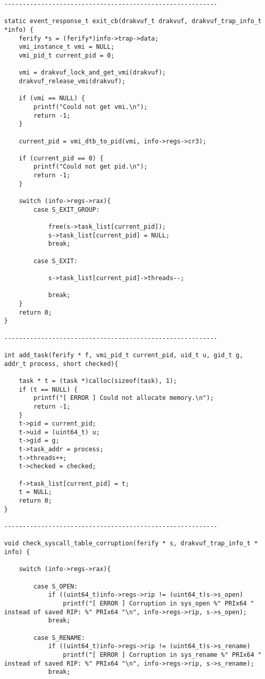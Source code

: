 {\begin{lstlisting}[style=CStyle]
----------------------------------------------------------

static event_response_t exit_cb(drakvuf_t drakvuf, drakvuf_trap_info_t *info) {
	ferify *s = (ferify*)info->trap->data;
	vmi_instance_t vmi = NULL; 
	vmi_pid_t current_pid = 0;
	
	vmi = drakvuf_lock_and_get_vmi(drakvuf); 
	drakvuf_release_vmi(drakvuf);
	
	if (vmi == NULL) {
		printf("Could not get vmi.\n");
		return -1;
	}
	
	current_pid = vmi_dtb_to_pid(vmi, info->regs->cr3);
	
	if (current_pid == 0) {
		printf("Could not get pid.\n");
		return -1;
	}

	switch (info->regs->rax){
		case S_EXIT_GROUP:	

			free(s->task_list[current_pid]);
			s->task_list[current_pid] = NULL;
			break;
		
		case S_EXIT:
	
			s->task_list[current_pid]->threads--;
		
			break;
	}
	return 0;
}

----------------------------------------------------------

int add_task(ferify * f, vmi_pid_t current_pid, uid_t u, gid_t g, addr_t process, short checked){

	task * t = (task *)calloc(sizeof(task), 1);
	if (t == NULL) {
		printf("[ ERROR ] Could not allocate memory.\n");
		return -1;
	}
	t->pid = current_pid;
	t->uid = (uint64_t) u;
	t->gid = g;
	t->task_addr = process;
	t->threads++;
	t->checked = checked;
	
	f->task_list[current_pid] = t;
	t = NULL;
	return 0;
}

----------------------------------------------------------

void check_syscall_table_corruption(ferify * s, drakvuf_trap_info_t * info) {
		
	switch (info->regs->rax){
	
		case S_OPEN:
			if ((uint64_t)info->regs->rip != (uint64_t)s->s_open) 	
				printf("[ ERROR ] Corruption in sys_open %" PRIx64 " instead of saved RIP: %" PRIx64 "\n", info->regs->rip, s->s_open);
			break;
		
		case S_RENAME:
			if ((uint64_t)info->regs->rip != (uint64_t)s->s_rename) 	
				printf("[ ERROR ] Corruption in sys_rename %" PRIx64 " instead of saved RIP: %" PRIx64 "\n", info->regs->rip, s->s_rename);
			break;
		

\end{lstlisting}}
